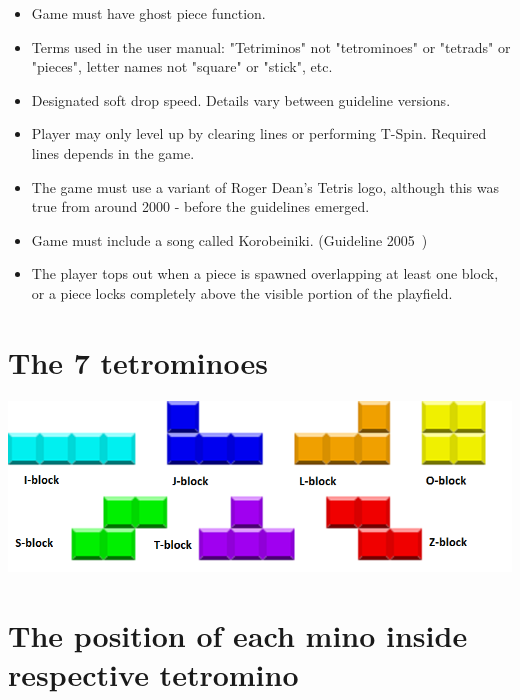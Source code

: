 \documentclass[a4paper]{article}
\begin{document}
\begin{itemize}
	\item Game must have ghost piece function.
	
	\item Terms used in the user manual: "Tetriminos" not "tetrominoes" or "tetrads" or "pieces", letter names not "square" or "stick", etc.
	
	\item Designated soft drop speed. Details vary between guideline versions.
	
	\item Player may only level up by clearing lines or performing T-Spin. Required lines depends in the game.
	
	\item The game must use a variant of Roger Dean's Tetris logo, although this was true from around 2000 - before the guidelines emerged.
	
	\item Game must include a song called Korobeiniki. (Guideline 2005~)
	
	\item The player tops out when a piece is spawned overlapping at least one block, or a piece locks completely above the visible portion of the playfield.
	
\end{itemize}


\section{The 7 tetrominoes}

	\parbox[]{0.8\textwidth}{
	\centering
	\includegraphics[scale=0.5]{resources/img/tetrominoes}
	\label{tetrominoes}
	}

\section{The position of each mino inside respective tetromino}
\end{document}
